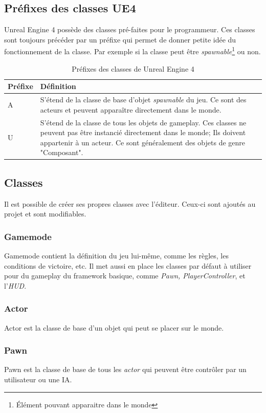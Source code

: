 \documentclass[11pt, a4paper, oneside]{article}
\begin{document}
\subsection{Préfixes des classes UE4}
Unreal Engine 4 possède des classes pré-faites pour le programmeur. Ces classes sont toujours précéder par un préfixe qui permet de donner petite idée du fonctionnement de la classe. Par exemple si la classe peut être \emph{spawnable}\footnote{Élément pouvant apparaitre dans le monde} ou non.
\begin{table}[h]
	\begin{center}
		\begin{tabularx}{\textwidth}{ l X }
			\hline
			\textbf{Préfixe} & \textbf{Définition}\\
			\hline
			\hline
			A & S'étend de la classe de base d'objet \emph{spawnable} du jeu. Ce sont des acteurs et peuvent apparaître directement dans le monde.\\
			\hline
			U & S'étend de la classe de tous les objets de gameplay. Ces classes ne peuvent pas être instancié directement dans le monde; Ils doivent appartenir à un acteur. Ce sont généralement des objets de genre "Composant".\\
			\hline
		\end{tabularx}
		\caption{Préfixes des classes de Unreal Engine 4}
		\label{table:prefixesclasses}
	\end{center}
\end{table}

\subsection{Classes}
Il est possible de créer ses propres classes avec l'éditeur. Ceux-ci sont ajoutés au projet et sont modifiables.
\subsubsection{Gamemode}
Gamemode contient la définition du jeu lui-même, comme les règles, les conditions de victoire, etc. Il met aussi en place les classes par défaut à utiliser pour du gameplay du framework basique, comme \textit{Pawn, PlayerController}, et l'\textit{HUD}.
\subsubsection{Actor}
Actor est la classe de base d'un objet qui peut se placer sur le monde.
\subsubsection{Pawn}
Pawn est la classe de base de tous les \emph{actor} qui peuvent être contrôler par un utilisateur ou une IA.
\end{document}
